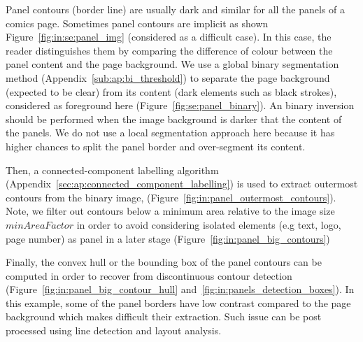 Panel contours (border line) are usually dark and similar for all the panels of a comics page.
Sometimes panel contours are implicit as shown Figure~\ref{fig:in:se:panel_img} (considered as a difficult case).
In this case, the reader distinguishes them by comparing the difference of colour between the panel content and the page background.
We use a global binary segmentation method (Appendix~\ref{sub:ap:bi_threshold}) to separate the page background (expected to be clear) from its content (dark elements such as black strokes), considered as foreground here (Figure~\ref{fig:se:panel_binary}).
An binary inversion should be performed when the image background is darker that the content of the panels.
We do not use a local segmentation approach here because it has higher chances to split the panel border and over-segment its content.

Then, a connected-component labelling algorithm (Appendix~\ref{sec:ap:connected_component_labelling}) is used to extract outermost contours from the binary image, (Figure~\ref{fig:in:panel_outermost_contours}).
Note, we filter out contours below a minimum area relative to the image size $minAreaFactor$ in order to avoid considering isolated elements (e.g text, logo, page number) as panel in a later stage (Figure~\ref{fig:in:panel_big_contours})

Finally, the convex hull or the bounding box of the panel contours can be computed in order to recover from discontinuous contour detection (Figure~\ref{fig:in:panel_big_contour_hull} and~\ref{fig:in:panels_detection_boxes}).
In this example, some of the panel borders have low contrast compared to the page background which makes difficult their extraction.
Such issue can be post processed using line detection and layout analysis.




